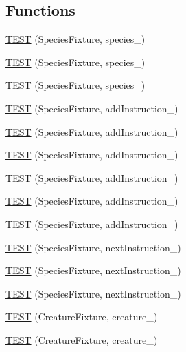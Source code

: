 \subsection*{Functions}
\begin{DoxyCompactItemize}
\item 
\hyperlink{TestDarwin_8c_09_09_a8b795b948311021a5a51f976d882959e}{T\-E\-S\-T} (Species\-Fixture, species\-\_)
\item 
\hyperlink{TestDarwin_8c_09_09_abcba3dcffa7b37d59deacf370f0943e2}{T\-E\-S\-T} (Species\-Fixture, species\-\_)
\item 
\hyperlink{TestDarwin_8c_09_09_a2723dfd9aa55a805340b58a22d8fa075}{T\-E\-S\-T} (Species\-Fixture, species\-\_)
\item 
\hyperlink{TestDarwin_8c_09_09_abcba9b4509b25e35a64d08ef9b563a35}{T\-E\-S\-T} (Species\-Fixture, add\-Instruction\-\_)
\item 
\hyperlink{TestDarwin_8c_09_09_a8cf9393c062825c306cd9f0f2adaba4f}{T\-E\-S\-T} (Species\-Fixture, add\-Instruction\-\_)
\item 
\hyperlink{TestDarwin_8c_09_09_a85aa24f02aaa674f6fc0f5a94b320b30}{T\-E\-S\-T} (Species\-Fixture, add\-Instruction\-\_)
\item 
\hyperlink{TestDarwin_8c_09_09_ad91d7baa982c9867802f3e5b97de9e86}{T\-E\-S\-T} (Species\-Fixture, add\-Instruction\-\_)
\item 
\hyperlink{TestDarwin_8c_09_09_a7a267fa4c3ced94a24e18fa8ce888d32}{T\-E\-S\-T} (Species\-Fixture, add\-Instruction\-\_)
\item 
\hyperlink{TestDarwin_8c_09_09_ae7f121da700334a9123c189b7f0898de}{T\-E\-S\-T} (Species\-Fixture, add\-Instruction\-\_)
\item 
\hyperlink{TestDarwin_8c_09_09_a2879bba4668acc492b9e10a3c908fa8b}{T\-E\-S\-T} (Species\-Fixture, next\-Instruction\-\_)
\item 
\hyperlink{TestDarwin_8c_09_09_a50bd75ae4f2ab316c151cb3a2e5ee97e}{T\-E\-S\-T} (Species\-Fixture, next\-Instruction\-\_)
\item 
\hyperlink{TestDarwin_8c_09_09_a1fda744c9bb9864c0ccd298ed486bfbf}{T\-E\-S\-T} (Species\-Fixture, next\-Instruction\-\_)
\item 
\hyperlink{TestDarwin_8c_09_09_a98e8c93153dc24893f512fa1c080b241}{T\-E\-S\-T} (Creature\-Fixture, creature\-\_)
\item 
\hyperlink{TestDarwin_8c_09_09_ab8595cbf167ea95ec81213b7f46f9b4a}{T\-E\-S\-T} (Creature\-Fixture, creature\-\_)
\item 

\end{DoxyCompactItemize}
